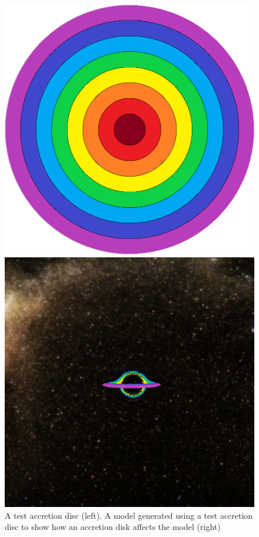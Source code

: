 \documentclass[oneside,openright,frontopenright, singlespacing]{dmathesis}
\begin{document}
\vspace{1em}
\begin{figure}[!ht]
	\centering
	\begin{minipage}{0.5\textwidth}
		\centering
		\includegraphics[width=0.9\linewidth]{img/test-accretion}
	\end{minipage}%
	\hfill
	\begin{minipage}{0.5\textwidth}
		\centering
		\includegraphics[width=0.9\linewidth]{img/milky-way-hdri-accretion(1)}
	\end{minipage}
	\caption{A test accretion disc (left). A model generated using a test accretion disc to show how an accretion disk affects the model (right)}
	\label{fig:Figure5.1}
\end{figure}
\end{document}
